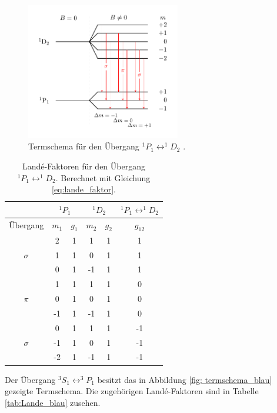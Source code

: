 \FloatBarrier
\begin{figure}[h]
  \centering
  \includegraphics[width=0.6\textwidth]{pics/termschema_rot.pdf}
  \caption{Termschema für den Übergang $^1P_1\leftrightarrow ^1\!\!D_2$ \cite{luckyjosh}.}
  \label{fig: termschema_rot}
\end{figure}
\FloatBarrier
\FloatBarrier
\begin{table}
	\centering
  \caption{Landé-Faktoren für den Übergang $^1P_1\leftrightarrow ^1\!\!D_2$.  Berechnet mit Gleichung \eqref{eq:lande_faktor}.}
	\label{tab:Lande_rot}
	\begin{tabular}{cccccc}
		\toprule
		{} & \multicolumn{2}{c}{${}^1P_1$}  & \multicolumn{2}{c}{${}^1D_2$}  & $^1P_1\leftrightarrow ^1\!\!D_2$ \\
		\midrule
		 Übergang &   $m_1$  & $g_{1}$ & $m_2$ & $ g_2$  & $g_{12}$  \\
		\midrule
		& 2 & 1 & 1 & 1 & 1\\
		$\sigma$& 1 & 1 & 0 & 1 & 1\\
		& 0 & 1 & -1 & 1 & 1\\
		\midrule
		& 1 & 1 & 1 & 1 & 0\\
		$\pi$ & 0 & 1 & 0 & 1 & 0\\
		& -1 & 1 & -1 & 1 & 0\\
		\midrule
		& 0 & 1 & 1 & 1 & -1\\
		$\sigma$ & -1 & 1 & 0 & 1 & -1\\
		& -2 & 1 & -1 & 1 & -1\\\bottomrule
	\end{tabular}

\end{table}
\FloatBarrier
Der Übergang $^3S_1\leftrightarrow ^3\!\!P_1$ besitzt das in Abbildung \ref{fig: termschema_blau} gezeigte
Termschema. Die zugehörigen Landé-Faktoren sind in Tabelle \ref{tab:Lande_blau} zusehen. %


